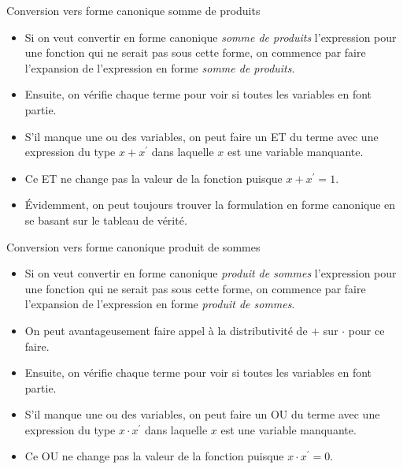 \documentclass[presentation]{beamer}
\begin{document}
\begin{frame}[label={sec:org24a47cc}]{Conversion vers forme canonique somme de produits}
\begin{itemize}
\item Si on veut convertir en forme canonique \emph{somme de produits} l'expression pour une fonction qui ne serait pas sous cette forme, on commence par faire l'expansion de l'expression en forme \emph{somme de produits}.

\item Ensuite, on vérifie chaque terme pour voir si toutes les variables en font partie.

\item S'il manque une ou des variables, on peut faire un ET du terme avec une expression du type \(x + x^\prime\) dans laquelle \(x\) est une variable manquante.

\item Ce ET ne change pas la valeur de la fonction puisque \(x + x^\prime = 1\).

\item Évidemment, on peut toujours trouver la formulation en forme canonique en se basant sur le tableau de vérité.
\end{itemize}
\end{frame}

\begin{frame}[label={sec:org22f9bbd}]{Conversion vers forme canonique produit de sommes}
\begin{itemize}
\item Si on veut convertir en forme canonique \emph{produit de sommes} l'expression pour une fonction qui ne serait pas sous cette forme, on commence par faire l'expansion de l'expression en forme \emph{produit de sommes}.

\item On peut avantageusement faire appel à la distributivité de \(+\) sur \(\cdot\) pour ce faire.

\item Ensuite, on vérifie chaque terme pour voir si toutes les variables en font partie.

\item S'il manque une ou des variables, on peut faire un OU du terme avec une expression du type \(x \cdot x^\prime\) dans laquelle \(x\) est une variable manquante.

\item Ce OU ne change pas la valeur de la fonction puisque \(x \cdot x^\prime = 0\).
\end{itemize}
\end{frame}
\end{document}
